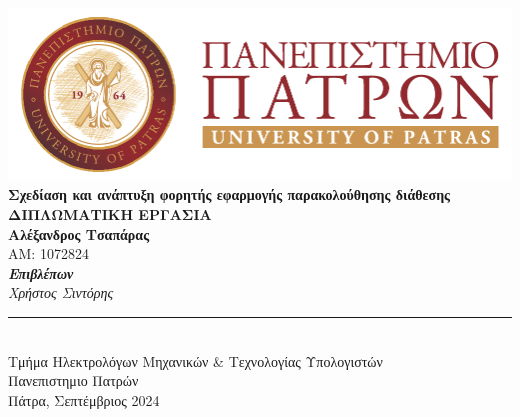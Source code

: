 \thispagestyle{empty}

\begin{titlepage}
    \begin{center}
        \includegraphics[width=0.8\linewidth]{figures/university/logo-greek.pdf} \\[5em]

        {\LARGE \textbf{Σχεδίαση και ανάπτυξη φορητής εφαρμογής παρακολούθησης διάθεσης}}\\[10mm]

        {\large \textbf{ΔΙΠΛΩΜΑΤΙΚΗ ΕΡΓΑΣΙΑ}}\\[5em]

        {\Large \textbf{Αλέξανδρος Τσαπάρας}} \\[1em]
        {\normalsize AM: 1072824} \\[2em]
        {\large \textbf{\textit{Επιβλέπων}}} \\[0.2em]
        {\large \textit{Χρήστος Σιντόρης}} \\[2em]

        \rule{0.5\textwidth}{0.4pt} \\[1.5em] %
        {\large Τμήμα Ηλεκτρολόγων Μηχανικών \& Τεχνολογίας Υπολογιστών} \\[0.5em]
        {\large Πανεπιστημιο Πατρών}\\[2em]

        {\large Πάτρα, Σεπτέμβριος 2024}
    \end{center}
\end{titlepage}

\thispagestyle{empty}